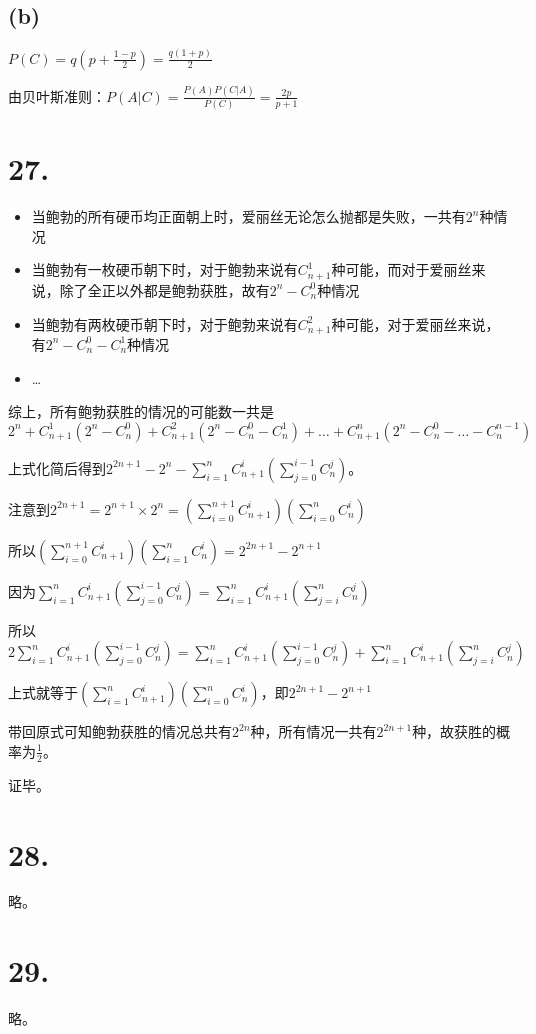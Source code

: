 \documentclass[UTF8]{report}
\begin{document}
        \subsection*{(b)}
            $P(C) = q(p + \frac{1 - p}{2}) = \frac{q(1 + p)}{2}$

            由贝叶斯准则：$P(A|C) = \frac{P(A)P(C|A)}{P(C)} = \frac{2p}{p + 1}$
    \section*{27.}
        \begin{itemize}
            \item 当鲍勃的所有硬币均正面朝上时，爱丽丝无论怎么抛都是失败，一共有$2^n$种情况
            \item 当鲍勃有一枚硬币朝下时，对于鲍勃来说有$C^1_{n+1}$种可能，而对于爱丽丝来说，除了全正以外都是鲍勃获胜，故有$2^n - C^0_n$种情况
            \item 当鲍勃有两枚硬币朝下时，对于鲍勃来说有$C^2_{n+1}$种可能，对于爱丽丝来说，有$2^n - C^0_n - C^1_n$种情况
            \item \dots
        \end{itemize}
        综上，所有鲍勃获胜的情况的可能数一共是
        $2^n + C_{n + 1}^1(2^n - C_n^0) + C_{n + 1}^2(2^n - C_n^0 - C_n^1) + \dots + C_{n + 1}^n(2^n - C_n^0 - \dots - C_n^{n - 1})$

        上式化简后得到$2^{2n + 1} - 2^n - \sum_{i = 1}^nC_{n + 1}^i(\sum_{j = 0}^{i - 1}C_n^j)$。

        注意到$2^{2n + 1} = 2^{n + 1} \times 2^n = (\sum_{i = 0}^{n + 1}C_{n + 1}^i)(\sum_{i = 0}^{n}C_n^i)$

        所以$(\sum_{i = 0}^{n + 1}C_{n + 1}^i)(\sum_{i = 1}^{n}C_n^i) = 2^{2n + 1} - 2^{n + 1}$

        因为$\sum_{i = 1}^{n}C_{n + 1}^i(\sum_{j = 0}^{i - 1}C_n^j) = \sum_{i = 1}^{n}C_{n + 1}^i(\sum_{j = i}^{n}C_n^j)$

        所以
        $2\sum_{i = 1}^{n}C_{n + 1}^i(\sum_{j = 0}^{i - 1}C_n^j) = \sum_{i = 1}^{n}C_{n + 1}^i(\sum_{j = 0}^{i - 1}C_n^j) + \sum_{i = 1}^{n}C_{n + 1}^i(\sum_{j = i}^{n}C_n^j)$

        上式就等于$(\sum_{i = 1}^{n}C_{n + 1}^i)(\sum_{i = 0}^{n}C_n^i)$，即$2^{2n + 1} - 2^{n + 1}$

        带回原式可知鲍勃获胜的情况总共有$2^{2n}$种，所有情况一共有$2^{2n + 1}$种，故获胜的概率为$\frac{1}{2}$。

        证毕。
    \section*{28.}
        略。
    \section*{29.}
        略。
\end{document}
